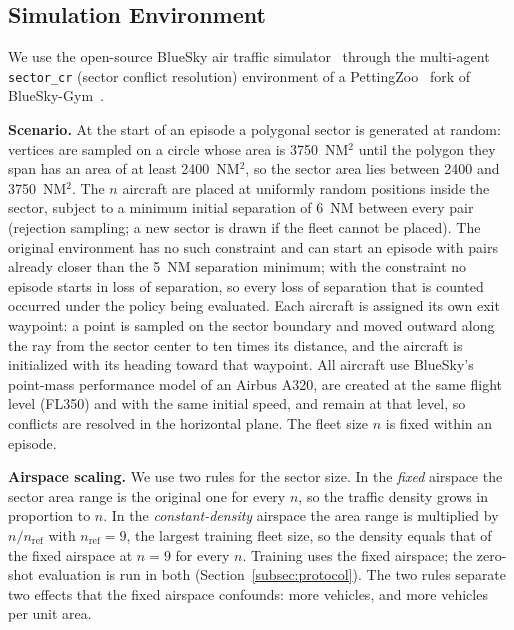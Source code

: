 \subsection{Simulation Environment}
\label{subsec:env}
We use the open-source BlueSky air traffic simulator~\cite{bluesky} through the
multi-agent \texttt{sector\_cr} (sector conflict resolution) environment of a
PettingZoo~\cite{pettingzoo} fork of BlueSky-Gym~\cite{bluesky-gym}.

\textbf{Scenario.} At the start of an episode a polygonal sector is generated at random:
vertices are sampled on a circle whose area is 3750~NM$^2$ until the polygon they span has
an area of at least 2400~NM$^2$, so the sector area lies between 2400 and 3750~NM$^2$. The
$n$ aircraft are placed at uniformly random positions inside the sector, subject to a minimum
initial separation of 6~NM between every pair (rejection sampling; a new sector is drawn if
the fleet cannot be placed). The original environment has no such constraint and can start an
episode with pairs already closer than the 5~NM separation minimum; with the constraint no
episode starts in loss of separation, so every loss of separation that is counted occurred
under the policy being evaluated. Each aircraft is
assigned its own exit waypoint: a point is sampled on the sector boundary and moved outward
along the ray from the sector center to ten times its distance, and the aircraft is
initialized with its heading toward that waypoint. All aircraft use BlueSky's point-mass
performance model of an Airbus A320, are created at the same flight level (FL350) and with
the same initial speed, and remain at that level, so conflicts are resolved in the
horizontal plane. The fleet size $n$ is fixed within an episode.

\textbf{Airspace scaling.} We use two rules for the sector size. In the \emph{fixed} airspace
the sector area range is the original one for every $n$, so the traffic density grows in
proportion to $n$. In the \emph{constant-density} airspace the area range is multiplied by
$n/n_{\text{ref}}$ with $n_{\text{ref}}=9$, the largest training fleet size, so the density
equals that of the fixed airspace at $n=9$ for every $n$. Training uses the fixed airspace;
the zero-shot evaluation is run in both (Section~\ref{subsec:protocol}). The two rules
separate two effects that the fixed airspace confounds: more vehicles, and more vehicles per
unit area.

